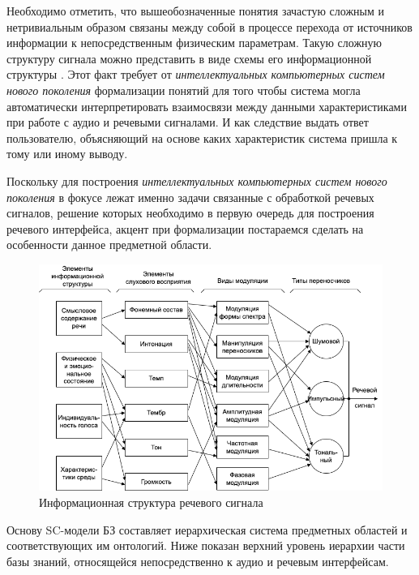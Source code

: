 Необходимо отметить, что вышеобозначенные понятия зачастую сложным и нетривиальным образом связаны между собой в процессе перехода от источников информации к непосредственным физическим параметрам. Такую сложную структуру сигнала можно представить в виде схемы его информационной структуры \textit{}. Этот факт требует от \textit{интеллектуальных компьютерных систем нового поколения} формализации понятий для того чтобы система могла автоматически интерпретировать взаимосвязи между данными характеристиками при работе с аудио и речевыми сигналами. И как следствие выдать ответ пользователю, объясняющий на основе каких характеристик система пришла к тому или иному выводу. 

Поскольку для построения \textit{интеллектуальных компьютерных систем нового поколения} в фокусе лежат именно задачи связанные с обработкой речевых сигналов, решение которых необходимо в первую очередь для построения речевого интерфейса, акцент при формализации постараемся сделать на особенности данное предметной области.

\begin{figure}[H]
    \centerline{
        \includegraphics[scale=0.8, width=1.0\textwidth]{author/part4/figures/ch43_fig03_speech-signal-inf-structure-ru.png}
    }
    \caption{Информационная структура речевого сигнала \cite{Lobanov2006}}
    \label{fig:speech-signal-inf-structure-ru}
\end{figure}

Основу SC-модели БЗ составляет иерархическая система предметных областей и соответствующих им онтологий. Ниже показан верхний уровень иерархии части базы знаний, относящейся непосредственно к аудио и речевым интерфейсам.

